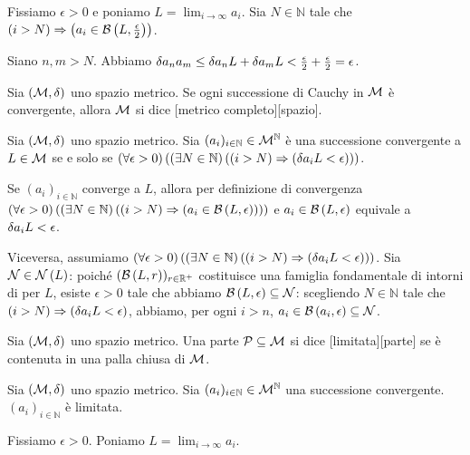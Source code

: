 \Proof Fissiamo $\epsilon > 0$ e poniamo $L = \lim_{i \rightarrow \infty} a_i$. Sia $N \in \mathbb{N}$ tale che $\left ( i > N \right ) \Rightarrow \left ( a_i \in \mathcal{B}\left (L,\frac{\epsilon}{2} \right) \right )$.
\par Siano $n, m > N$. Abbiamo $\delta{a_n}{a_m} \leq \delta{a_n}{L} + \delta{a_m}{L} < \frac{\epsilon}{2} + \frac{\epsilon}{2} = \epsilon$. \EndProof
\begin{Definition}
	Sia $(\mathcal{M},\delta)$ uno spazio metrico.
	Se ogni successione di Cauchy in $\mathcal{M}$ \`e convergente, allora $\mathcal{M}$ si dice [metrico completo][spazio].
\end{Definition}
\begin{Theorem}
	Sia $(\mathcal{M},\delta)$ uno spazio metrico.
	Sia $(a_i)_{i \in \mathbb{N}} \in \mathcal{M}^\mathbb{N}$ \`e una successione convergente a $L \in \mathcal{M}$ se e solo se $\left ( \forall \epsilon > 0 \right ) \left ( \left ( \exists N \in \mathbb{N} \right ) \left ( \left ( i > N \right ) \Rightarrow \left ( \delta{a_i}{L} < \epsilon \right ) \right ) \right )$.
\end{Theorem}
\Proof Se $(a_i)_{i \in \mathbb{N}}$ converge a $L$, allora per definizione di convergenza $\left ( \forall \epsilon > 0 \right ) \left ( \left ( \exists N \in \mathbb{N} \right ) \left ( \left ( i > N \right ) \Rightarrow \left ( a_i \in \mathcal{B}\left (L,\epsilon \right) \right ) \right ) \right )$ e $a_i \in \mathcal{B}\left (L,\epsilon \right)$ equivale a $\delta{a_i}{L} < \epsilon$.
\par Viceversa, assumiamo $\left ( \forall \epsilon > 0 \right ) \left ( \left ( \exists N \in \mathbb{N} \right ) \left ( \left ( i > N \right ) \Rightarrow \left ( \delta{a_i}{L} < \epsilon \right ) \right ) \right )$. Sia $\Neighborhood \in \Neighborhoods{L}$: poich\'e $(\mathcal{B}\left (L,r \right))_{r \in \mathbb{R}^+}$ costituisce una famiglia fondamentale di intorni di per $L$, esiste $\epsilon > 0$ tale che abbiamo $\mathcal{B}\left (L,\epsilon \right) \subseteq \mathcal{N}$: scegliendo $N \in \mathbb{N}$ tale che $\left ( i > N \right ) \Rightarrow \left ( \delta{a_i}{L} < \epsilon \right )$, abbiamo, per ogni $i > n$, $a_i \in \mathcal{B}\left (a_i,\epsilon \right) \subseteq \mathcal{N}$. \EndProof
\begin{Definition}
	Sia $(\mathcal{M},\delta)$ uno spazio metrico.
	Una parte $\mathcal{P} \subseteq \mathcal{M}$ si dice [limitata][parte] se \`e contenuta in una palla chiusa di $\mathcal{M}$.
\end{Definition}
\begin{Theorem}
	Sia $(\mathcal{M},\delta)$ uno spazio metrico.
	Sia $(a_i)_{i \in \mathbb{N}} \in \mathcal{M}^\mathbb{N}$ una successione convergente. $(a_i)_{i \in \mathbb{N}}$ \`e limitata.
\end{Theorem}
\Proof Fissiamo $\epsilon > 0$. Poniamo $L = \lim_{i \rightarrow \infty} a_i$.
